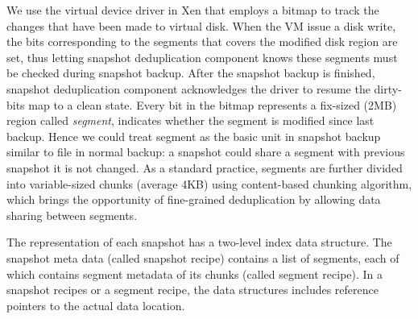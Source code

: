We use the virtual device driver in Xen that employs a bitmap to track the changes 
that have been made to virtual disk.
When the VM issue a disk write, the bits corresponding to the segments that covers 
the modified disk region are set, thus letting snapshot deduplication component knows these
segments must be checked during snapshot backup. After the snapshot backup is finished, 
snapshot deduplication component acknowledges the driver to resume the dirty-bits map to
a clean state.
Every bit in the bitmap represents a fix-sized (2MB) region called \textit{segment}, indicates whether the segment
is modified since last backup. Hence we could treat segment as the basic unit 
in snapshot backup similar to
file in normal backup: a snapshot could share a segment with previous snapshot it is not changed. 
As a standard practice, segments are further divided into variable-sized chunks (average 4KB) 
using content-based chunking algorithm, which brings the opportunity of fine-grained deduplication by
allowing data sharing between segments.

The representation of each snapshot has  a two-level index data structure.
The snapshot meta data (called snapshot recipe) contains a list of segments, each of which contains segment
metadata of its chunks (called segment recipe).
In a snapshot recipes or a segment recipe, 
the data structures  includes reference pointers to the actual data location.





